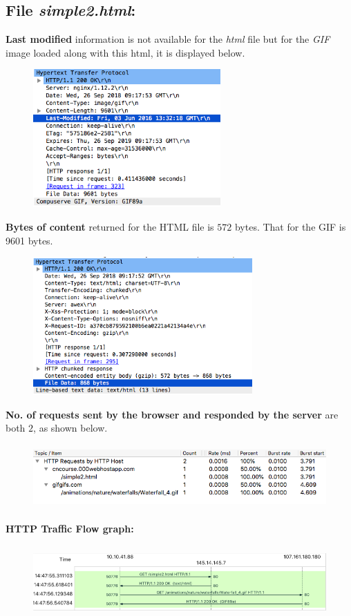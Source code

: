 \documentclass[]{report}
\begin{document}
\subsection{File \textit{simple2.html}:}
\textbf{Last modified} information is not available for the \textit{html} file but for the \textit{GIF} image loaded along with this html, it is displayed below.
\begin{figure}[H]
	\vspace{0pt}
	\includegraphics[height = 150pt, keepaspectratio]{Snapshots/q1/simple2/1_2_5.png}
\end{figure}
\textbf{Bytes of content} returned for the HTML file is $572$ bytes. That for the GIF is 9601 bytes.
\begin{figure}[H]
	\vspace{0pt}
	\includegraphics[height = 150pt, keepaspectratio]{Snapshots/q1/simple2/1_2_6.png}
\end{figure}
\textbf{No. of requests sent by the browser and responded by the server} are both $2$, as shown below. 
\begin{figure}[H]
	\vspace{0pt}
	\includegraphics[height = 70pt, keepaspectratio]{Snapshots/q1/simple2/1_2_8.png}
\end{figure}
\textbf{HTTP Traffic Flow graph:}
\begin{figure}[H]
	\vspace{0pt}
	\includegraphics[height = 80pt, keepaspectratio]{Snapshots/q1/simple2/1_2_9.png}
\end{figure}
\end{document}
